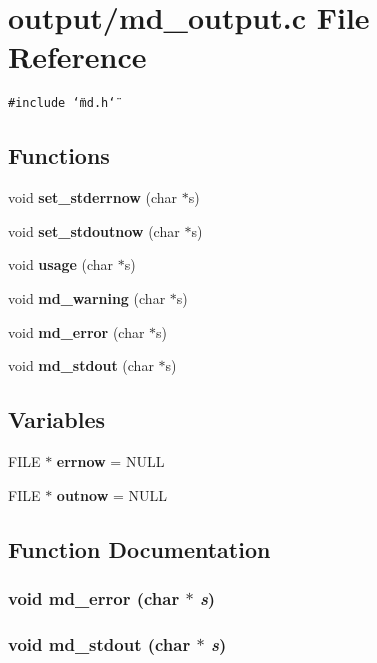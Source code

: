 \section{output/md\_\-output.c File Reference}
\label{md__output_8c}
{\tt \#include \char`\"{}md.h\char`\"{}}\par
\subsection*{Functions}
\begin{CompactItemize}
\item 
void {\bf set\_\-stderrnow} (char $\ast$s)
\item 
void {\bf set\_\-stdoutnow} (char $\ast$s)
\item 
void {\bf usage} (char $\ast$s)
\item 
void {\bf md\_\-warning} (char $\ast$s)
\item 
void {\bf md\_\-error} (char $\ast$s)
\item 
void {\bf md\_\-stdout} (char $\ast$s)
\end{CompactItemize}
\subsection*{Variables}
\begin{CompactItemize}
\item 
FILE $\ast$ {\bf errnow} = NULL
\item 
FILE $\ast$ {\bf outnow} = NULL
\end{CompactItemize}


\subsection{Function Documentation}
\subsubsection{\setlength{\rightskip}{0pt plus 5cm}void md\_\-error (char $\ast$ {\em s})}\label{md__output_8c_d9671a81862af9cb142dd32bef933b79}


\subsubsection{\setlength{\rightskip}{0pt plus 5cm}void md\_\-stdout (char $\ast$ {\em s})}\label{md__output_8c_3a4cd137b73686b5d8fc5f6cde5f0b95}



